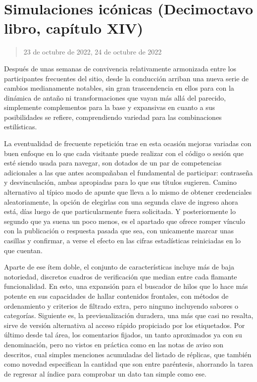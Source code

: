 \documentclass[
]{book}
\begin{document}
\hypertarget{simulaciones-icuxf3nicas-decimoctavo-libro-capuxedtulo-xiv}{%
\section{Simulaciones icónicas (Decimoctavo libro, capítulo XIV)}\label{simulaciones-icuxf3nicas-decimoctavo-libro-capuxedtulo-xiv}}

\begin{quote}
23 de octubre de 2022, 24 de octubre de 2022
\end{quote}

Después de unas semanas de convivencia relativamente armonizada entre los participantes frecuentes del sitio, desde la conducción arriban una nueva serie de cambios medianamente notables, sin gran trascendencia en ellos para con la dinámica de antaño ni transformaciones que vayan más allá del parecido, simplemente complementos para la base y expansivas en cuanto a sus posibilidades se refiere, comprendiendo variedad para las combinaciones estilísticas.

La eventualidad de frecuente repetición trae en esta ocasión mejoras variadas con buen enfoque en lo que cada visitante puede realizar con el código o sesión que esté siendo usada para navegar, son dotados de un par de competencias adicionales a las que antes acompañaban el fundamental de participar: contraseña y desvinculación, ambas apropiadas para lo que sus títulos sugieren. Camino alternativo al típico modo de apunte que lleva a lo mismo de obtener credenciales aleatoriamente, la opción de elegirlas con una segunda clave de ingreso ahora está, días luego de que particularmente fuera solicitada. Y posteriormente lo segundo que ya suena un poco menos, es el apartado que ofrece romper vínculo con la publicación o respuesta pasada que sea, con unicamente marcar unas casillas y confirmar, a verse el efecto en las cifras estadísticas reiniciadas en lo que cuentan.

Aparte de ese ítem doble, el conjunto de características incluye más de baja notoriedad, discretos cuadros de verificación que median entre cada flamante funcionalidad. En esto, una expansión para el buscador de hilos que lo hace más potente en sus capacidades de hallar contenidos frontales, con métodos de ordenamiento y criterios de filtrado extra, pero ninguno incluyendo sabores o categorías. Siguiente es, la previsualización duradera, una más que casi no resalta, sirve de versión alternativa al acceso rápido propiciado por los etiquetados. Por último desde tal área, los comentarios fijados, un tanto aproximados ya con su denominación, pero no vistos en práctica como en las notas de aviso son descritos, cual simples menciones acumuladas del listado de réplicas, que también como novedad especifican la cantidad que son entre paréntesis, ahorrando la tarea de regresar al índice para comprobar un dato tan simple como ese.
\end{document}
